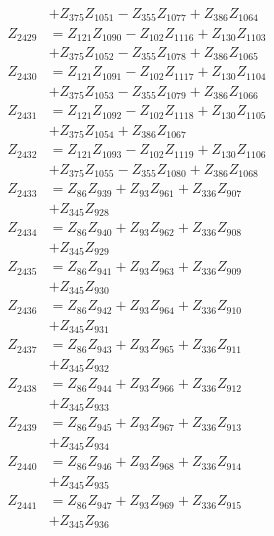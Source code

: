 \begin{multicols}{2}
\begin{align}
&+ Z_{375}Z_{1051} - Z_{355}Z_{1077} + Z_{386}Z_{1064} \nonumber \\
Z_{2429} &= Z_{121}Z_{1090} - Z_{102}Z_{1116} + Z_{130}Z_{1103}  \nonumber \\
&+ Z_{375}Z_{1052} - Z_{355}Z_{1078} + Z_{386}Z_{1065} \nonumber \\
Z_{2430} &= Z_{121}Z_{1091} - Z_{102}Z_{1117} + Z_{130}Z_{1104}  \nonumber \\
&+ Z_{375}Z_{1053} - Z_{355}Z_{1079} + Z_{386}Z_{1066} \nonumber \\
Z_{2431} &= Z_{121}Z_{1092} - Z_{102}Z_{1118} + Z_{130}Z_{1105}  \nonumber \\
&+ Z_{375}Z_{1054} + Z_{386}Z_{1067} \nonumber \\
Z_{2432} &= Z_{121}Z_{1093} - Z_{102}Z_{1119} + Z_{130}Z_{1106}  \nonumber \\
&+ Z_{375}Z_{1055} - Z_{355}Z_{1080} + Z_{386}Z_{1068} \nonumber \\
Z_{2433} &= Z_{86}Z_{939} + Z_{93}Z_{961} + Z_{336}Z_{907}  \nonumber \\
&+ Z_{345}Z_{928} \nonumber \\
Z_{2434} &= Z_{86}Z_{940} + Z_{93}Z_{962} + Z_{336}Z_{908}  \nonumber \\
&+ Z_{345}Z_{929} \nonumber \\
Z_{2435} &= Z_{86}Z_{941} + Z_{93}Z_{963} + Z_{336}Z_{909}  \nonumber \\
&+ Z_{345}Z_{930} \nonumber \\
Z_{2436} &= Z_{86}Z_{942} + Z_{93}Z_{964} + Z_{336}Z_{910}  \nonumber \\
&+ Z_{345}Z_{931} \nonumber \\
Z_{2437} &= Z_{86}Z_{943} + Z_{93}Z_{965} + Z_{336}Z_{911}  \nonumber \\
&+ Z_{345}Z_{932} \nonumber \\
Z_{2438} &= Z_{86}Z_{944} + Z_{93}Z_{966} + Z_{336}Z_{912}  \nonumber \\
&+ Z_{345}Z_{933} \nonumber \\
Z_{2439} &= Z_{86}Z_{945} + Z_{93}Z_{967} + Z_{336}Z_{913}  \nonumber \\
&+ Z_{345}Z_{934} \nonumber \\
Z_{2440} &= Z_{86}Z_{946} + Z_{93}Z_{968} + Z_{336}Z_{914}  \nonumber \\
&+ Z_{345}Z_{935} \nonumber \\
Z_{2441} &= Z_{86}Z_{947} + Z_{93}Z_{969} + Z_{336}Z_{915}  \nonumber \\
&+ Z_{345}Z_{936} \nonumber \\

\end{align}
\end{multicols}
